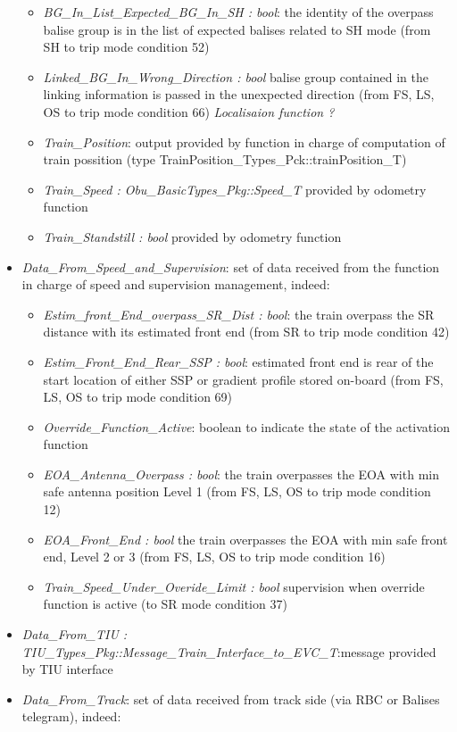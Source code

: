 \begin{itemize}
\begin{itemize}
\item \emph{BG\_In\_List\_Expected\_BG\_In\_SH : bool}: the identity of the overpass balise group is in the list of expected balises related to SH mode (from SH to trip mode condition 52)
\item \emph{Linked\_BG\_In\_Wrong\_Direction : bool} balise group contained in the linking information is passed in the unexpected direction (from FS, LS, OS to trip mode condition 66) \emph{Localisaion function ?}
\item \emph{Train\_Position}: output provided by function in charge of computation of train possition (type	TrainPosition\_Types\_Pck::trainPosition\_T)	\item \emph{Train\_Speed : Obu\_BasicTypes\_Pkg::Speed\_T} provided by odometry function
\item \emph{Train\_Standstill : bool} provided by odometry function
\end{itemize}
\item \emph{Data\_From\_Speed\_and\_Supervision}: set of data received from the function in charge of speed and supervision management, indeed:
\begin{itemize}
\item \emph{Estim\_front\_End\_overpass\_SR\_Dist : bool}: the train overpass the SR distance with its estimated front end (from SR to trip mode condition 42) 
\item \emph{Estim\_Front\_End\_Rear\_SSP : bool}: estimated front end is rear of the start location of either SSP or gradient profile stored on-board (from FS, LS, OS to trip mode condition 69)
\item \emph{Override\_Function\_Active}: boolean to indicate the state of the activation function 	  	
\item \emph{EOA\_Antenna\_Overpass : bool}: the train overpasses the  EOA  with min safe antenna position Level 1 (from FS, LS, OS to trip mode condition 12)
\item \emph{EOA\_Front\_End : bool} the train overpasses the  EOA  with min safe front end, Level 2 or 3 (from FS, LS, OS to trip mode condition 16)
\item \emph{Train\_Speed\_Under\_Overide\_Limit : bool} supervision when override function is active (to SR mode condition 37)
\end{itemize}
\item \emph{Data\_From\_TIU : TIU\_Types\_Pkg::Message\_Train\_Interface\_to\_EVC\_T}:message provided by TIU interface
\item \emph{Data\_From\_Track}: set of data received from track side (via RBC or Balises telegram), indeed:

\end{itemize}
